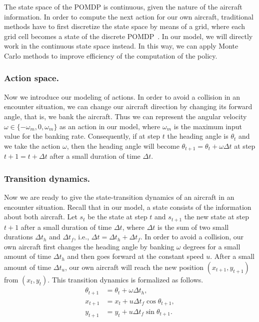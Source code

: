 \documentclass{article}
\begin{document}
The state space of the POMDP is continuous, given the nature of the aircraft information.
In order to compute the next action for our own aircraft, traditional methods have to first discretize the state space by means of a grid, where each grid cell becomes a state of the discrete POMDP~\cite{article}.
In our model, we will directly work in the continuous state space instead.
In this way, we can apply Monte Carlo methods to improve efficiency of the computation of the policy. 

\subsubsection{Action space.}
Now we introduce our modeling of actions.
In order to avoid a collision in an encounter situation, we can change our aircraft direction by changing its forward angle, that is, we bank the aircraft.
Thus we can represent the angular velocity $\omega \in \{-\omega_{m}, 0, \omega_{m}\}$ as an action in our model, where $\omega_{m}$ is the maximum input value for the banking rate.
Consequently, if at step $t$ the heading angle is $\theta_{t}$ and we take the action $\omega$, then the heading angle will become $\theta_{t+1} = \theta_{t} + \omega \Delta t$ at step $t+1 = t + \Delta t$ after a small duration of time $\Delta t$.

\subsubsection{Transition dynamics.}
Now we are ready to give the state-transition dynamics of an aircraft in an encounter situation.
Recall that in our model, a state consists of the information about both aircraft.
Let $s_{t}$ be the state at step $t$ and $s_{t+1}$ the new state at step $t+1$ after a small duration of time $\Delta t$, where $\Delta t$ is the sum of two small durations $\Delta t_{h}$ and $\Delta t_{f}$, i.e., $\Delta t = \Delta t_{h} + \Delta t_{f}$.
In order to avoid a collision, our own aircraft first changes the heading angle by banking $\omega$ degrees for a small amount of time $\Delta t_{h}$ and then goes forward at the constant speed $u$.
After a small amount of time $\Delta t_{u}$, our own aircraft will reach the new position $(x_{t+1}, y_{t+1})$ from $(x_{t},y_{t})$.
This transition dynamics is formalized as follows.
\begin{equation} 
\label{eq:transition}
	\begin{split}
		\theta_{t+1} &= \theta_{t} + \omega \Delta t_{h},\\
		x_{t+1} &= x_{t} + u \Delta t_{f} \cos \theta_{t+1},\\
		y_{t+1} &= y_{t} + u \Delta t_{f} \sin \theta_{t+1}.
	\end{split}
\end{equation}
\end{document}
